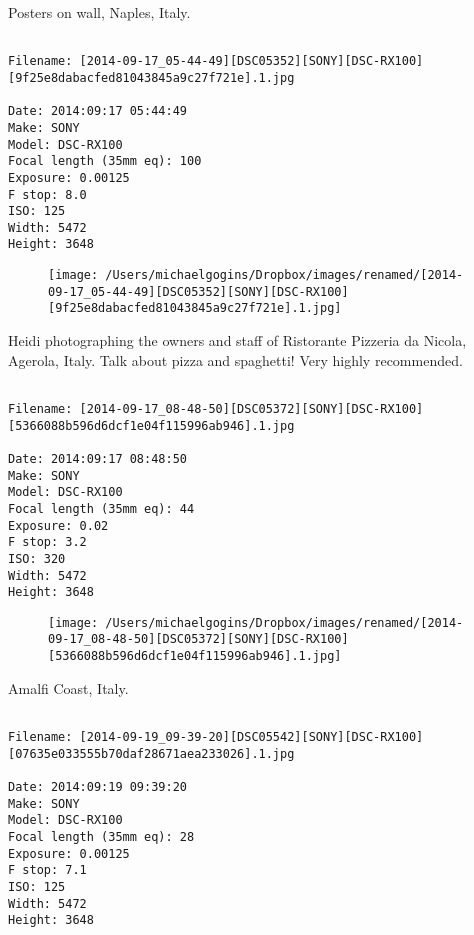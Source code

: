 \documentclass[11pt,letter,DIV=14,paper=landscape]{scrbook}
\begin{document}
\clearpage
\noindent Posters on wall, Naples, Italy.
\noindent
\begin{lstlisting}

Filename: [2014-09-17_05-44-49][DSC05352][SONY][DSC-RX100][9f25e8dabacfed81043845a9c27f721e].1.jpg

Date: 2014:09:17 05:44:49
Make: SONY
Model: DSC-RX100
Focal length (35mm eq): 100
Exposure: 0.00125
F stop: 8.0
ISO: 125
Width: 5472
Height: 3648
\end{lstlisting}
\clearpage

\begin{figure}
\texttt{[image: /Users/michaelgogins/Dropbox/images/renamed/[2014-09-17\_05-44-49][DSC05352][SONY][DSC-RX100][9f25e8dabacfed81043845a9c27f721e].1.jpg]}
\end{figure}
    
\clearpage
\noindent Heidi photographing the owners and staff of Ristorante Pizzeria da Nicola, Agerola, Italy. Talk about pizza and spaghetti! Very highly recommended.
\noindent
\begin{lstlisting}

Filename: [2014-09-17_08-48-50][DSC05372][SONY][DSC-RX100][5366088b596d6dcf1e04f115996ab946].1.jpg

Date: 2014:09:17 08:48:50
Make: SONY
Model: DSC-RX100
Focal length (35mm eq): 44
Exposure: 0.02
F stop: 3.2
ISO: 320
Width: 5472
Height: 3648
\end{lstlisting}
\clearpage

\begin{figure}
\texttt{[image: /Users/michaelgogins/Dropbox/images/renamed/[2014-09-17\_08-48-50][DSC05372][SONY][DSC-RX100][5366088b596d6dcf1e04f115996ab946].1.jpg]}
\end{figure}
    
\clearpage
\noindent Amalfi Coast, Italy.
\noindent
\begin{lstlisting}

Filename: [2014-09-19_09-39-20][DSC05542][SONY][DSC-RX100][07635e033555b70daf28671aea233026].1.jpg

Date: 2014:09:19 09:39:20
Make: SONY
Model: DSC-RX100
Focal length (35mm eq): 28
Exposure: 0.00125
F stop: 7.1
ISO: 125
Width: 5472
Height: 3648
\end{lstlisting}
\clearpage
\end{document}
